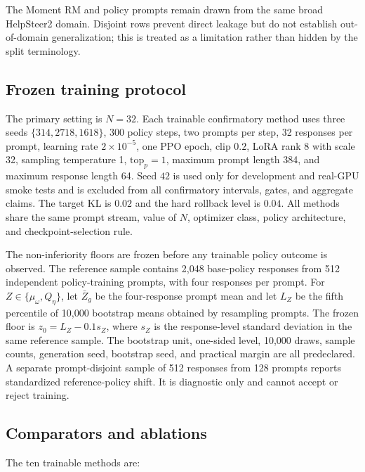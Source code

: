 The Moment RM and policy prompts remain drawn from the same broad HelpSteer2
domain.  Disjoint rows prevent direct leakage but do not establish
out-of-domain generalization; this is treated as a limitation rather than
hidden by the split terminology.

\subsection{Frozen training protocol}
\label{subsec:experimental-protocol}

The primary setting is \(N=32\).  Each trainable confirmatory method uses
three seeds \(\{314,2718,1618\}\), 300 policy steps, two prompts
per step, 32 responses per prompt, learning rate \(2\times10^{-5}\),
one PPO epoch, clip \(0.2\), LoRA rank 8 with scale 32, sampling
temperature 1, \(\mathrm{top}_p=1\), maximum prompt length 384,
and maximum response length 64. Seed \(42\) is used only for development and real-GPU smoke tests and is
excluded from all confirmatory intervals, gates, and aggregate claims. The target KL is \(0.02\) and the
hard rollback level is \(0.04\).  All methods share the same prompt
stream, value of \(N\), optimizer class, policy architecture, and
checkpoint-selection rule.

The non-inferiority floors are frozen before any trainable policy outcome is
observed.  The reference sample contains 2,048 base-policy responses from 512
independent policy-training prompts, with four responses per prompt.  For
\(Z\in\{\mu_\omega,Q_\eta\}\), let
\(\bar Z_g\) be the four-response prompt mean and let
\(L_Z\) be the fifth percentile of 10,000 bootstrap means obtained by
resampling prompts.  The frozen floor is \(z_0=L_Z-0.1s_Z\),
where \(s_Z\) is the response-level standard deviation in the same
reference sample.  The bootstrap unit, one-sided level, 10,000 draws, sample
counts, generation seed, bootstrap seed, and practical margin are all
predeclared.  A separate prompt-disjoint sample of 512 responses from 128
prompts reports standardized reference-policy shift.  It is diagnostic only
and cannot accept or reject training.

\subsection{Comparators and ablations}
\label{subsec:comparators}

The ten trainable methods are:


